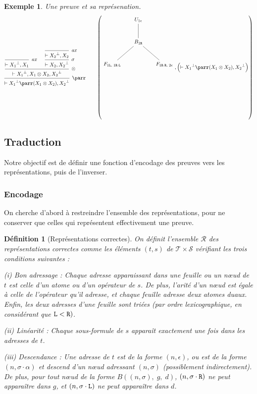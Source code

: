 \documentclass[11pt,a4paper]{article}
\newtheorem{example}{Exemple}
\newtheorem{definition}{Définition}
\newcommand*{\orth}{^\perp}
\newcommand*{\tensor}{\otimes}
\newcommand*{\axv}[1]{\infer{0}[\ensuremath{\mathit{ax}}]{\vdash #1}}
\newcommand*{\tensorv}[1]{\infer{2}[\ensuremath{\tensor}]{\vdash #1}}
\newcommand*{\parrv}[1]{\infer{1}[\ensuremath{\parr}]{\vdash #1}}
\newcommand*{\permv}[1]{\infer{1}[\ensuremath{\sigma}]{\vdash #1}}
\newcommand*{\Left}{\textnormal{\texttt{L}}}
\newcommand*{\Right}{\textnormal{\texttt{R}}}
\newcommand*{\sequents}{\ensuremath{\mathcal{S}}}
\newcommand*{\trees}{\ensuremath{\mathcal{T}}}
\newcommand*{\representationslarge}{\ensuremath{\trees \times \sequents}}
\newcommand*{\representations}{\ensuremath{\mathcal{R}}}
\begin{document}
\begin{example}
Une preuve et sa représenation.
\begin{equation*}
\begin{prooftree}
    \axv{{X_1}\orth, X_1}
    \axv{{X_2}\orth, X_2}
    \permv{X_2, {X_2}\orth}
    \tensorv{{X_1}\orth, X_1 \tensor X_2, {X_2}\orth}
    \parrv{{X_1}\orth \parr (X_1 \tensor X_2), {X_2}\orth}
\end{prooftree}
\qquad
\left(
\begin{tikzpicture}%
    [level distance=1.5cm,
    level 2/.style={sibling distance=3.5cm}]
    \node {$U_{1 \epsilon}$}
    child {node {$B_{1 \Right}$}
        child {node {$F_{1 \Left, \; 1 \Right \cdot \Left}$}}
        child {node {$F_{1 \Right \cdot \Right, \; 2 \epsilon}$}}
    };
\end{tikzpicture}
, \left( \vdash {X_1}\orth \parr (X_1 \tensor X_2), {X_2}\orth \right)
\right)
\end{equation*}
\end{example}

\subsection{Traduction}
Notre objectif est de définir une fonction d'encodage des preuves vers les représentations, puis de l'inverser.

\subsubsection{Encodage}
On cherche d'abord à restreindre l'ensemble des représentations, pour ne conserver que celles qui représentent effectivement une preuve.

\begin{definition}[Représentations correctes]
    On définit l'ensemble \representations{} des représentations correctes comme les éléments $(t, s)$ de $\representationslarge$ vérifiant les trois conditions suivantes :
    \item[(i) Bon adressage :] Chaque adresse apparaissant dans une feuille ou un n\oe ud de $t$ est celle d'un atome ou d'un opérateur de $s$. De plus, l'arité d'un n\oe ud est égale à celle de l'opérateur qu'il adresse, et chaque feuille adresse deux atomes duaux. Enfin, les deux adresses d'une feuille sont triées (par ordre lexicographique, en considérant que $\Left < \Right)$.
    
    \item[(ii) Linéarité :] Chaque sous-formule de $s$ apparaît exactement une fois dans les adresses de $t$.

    \item[(iii) Descendance :] Une adresse de $t$ est de la forme $(n, \epsilon)$, ou est de la forme $(n, \sigma \cdot \alpha)$ et descend d'un n\oe ud adressant $(n, \sigma)$ (possiblement indirectement). De plus, pour tout n\oe ud de la forme $B((n, \sigma), \; g, \; d)$, $(n, \sigma \cdot \Right)$ ne peut apparaître dans $g$, et $(n, \sigma \cdot \Left)$ ne peut apparaître dans $d$.
\end{definition}
\end{document}

